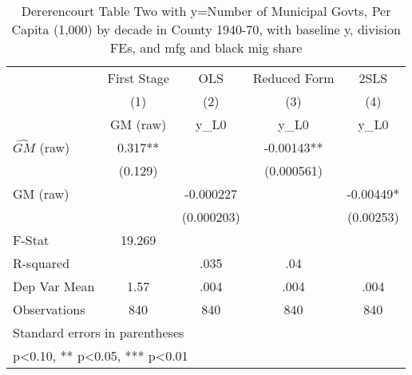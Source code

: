 \begin{table}[htbp]\centering
\def\sym#1{\ifmmode^{#1}\else\(^{#1}\)\fi}
\caption{Dererencourt Table Two with y=Number of Municipal Govts, Per Capita (1,000) by decade in County 1940-70, with baseline y, division FEs, and mfg and black mig share}
\begin{tabular}{l*{4}{c}}
\toprule
                    & First Stage   &         OLS   &Reduced Form   &        2SLS   \\
                    &\multicolumn{1}{c}{(1)}&\multicolumn{1}{c}{(2)}&\multicolumn{1}{c}{(3)}&\multicolumn{1}{c}{(4)}\\
                    &\multicolumn{1}{c}{GM  (raw)}&\multicolumn{1}{c}{y\_L0}&\multicolumn{1}{c}{y\_L0}&\multicolumn{1}{c}{y\_L0}\\
\midrule
$\hat{GM}$ (raw)    &       0.317** &               &    -0.00143** &               \\
                    &     (0.129)   &               &  (0.000561)   &               \\
\addlinespace
GM  (raw)           &               &   -0.000227   &               &    -0.00449*  \\
                    &               &  (0.000203)   &               &   (0.00253)   \\
\midrule
F-Stat              &      19.269   &               &               &               \\
R-squared           &               &        .035   &         .04   &               \\
Dep Var Mean        &        1.57   &        .004   &        .004   &        .004   \\
Observations        &         840   &         840   &         840   &         840   \\
\bottomrule
\multicolumn{5}{l}{\footnotesize Standard errors in parentheses}\\
\multicolumn{5}{l}{\footnotesize * p<0.10, ** p<0.05, *** p<0.01}\\
\end{tabular}
\end{table}
